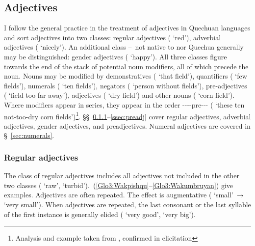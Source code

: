 \subsection{Adjectives}
I follow the general practice in the treatment of adjectives in Quechuan languages and sort \SYQ adjectives into two classes: regular adjectives ( ‘red’), adverbial adjectives ( ‘nicely’). An additional class --~not native to \SYQ{} nor Quechua generally may be distinguished: gender adjectives ( ‘happy’). All three classes figure towards the end of the stack of potential noun modifiers, all of which precede the noun. Nouns may be modified by demonstratives (  ‘that field’), quantifiers (  ‘few fields’), numerals (  ‘ten fields’), negators (  ‘person without fields’), pre-adjectives (   ‘field too far away’), adjectives (  ‘dry field’) and other nouns (  ‘corn field’). Where modifiers appear in series, they appear in the order ----pre--- (       ‘these ten not-too-dry corn fields’)\footnote{Analysis and example taken from \citet{Parker76gram}, confirmed in elicitation}. §§~\ref{ssec:regadj}--\ref{ssec:preadj} cover regular adjectives, adverbial adjectives, gender adjectives, and preadjectives. Numeral adjectives are covered in §~\ref{sec:numerals}.

\subsubsection{Regular adjectives}\label{ssec:regadj}
The class of regular adjectives includes all adjectives not included in the other two classes ( ‘raw’,  ‘turbid’).~(\ref{Glo3:Wakpishqu}--\ref{Glo3:Wakumbruyan}) give examples. Adjectives are often repeated. The effect is augmentative ( ‘small’~→~ ‘very small’). When adjectives are repeated, the last consonant or the last syllable of the first instance is generally elided ( ‘very good’,  ‘very big’).\\

